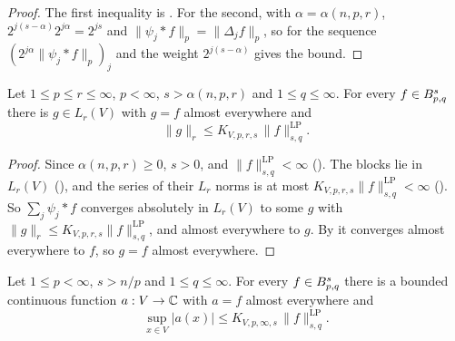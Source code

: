 \begin{proof}
\leanok
The first inequality is . For the second, with
$\alpha = \alpha(n, p, r)$, $2^{j(s - \alpha)} 2^{j\alpha} = 2^{js}$ and
$\|\psi_j * f\|_p = \|\Delta_j f\|_p$, so  for the sequence
$(2^{j\alpha} \|\psi_j * f\|_p)_j$ and the weight $2^{j(s-\alpha)}$ gives the bound.
\end{proof}

\begin{theorem}
\label{thm:besov-embedding-rd}
\leanok
{}
Let $1 \leq p \leq r \leq \infty$, $p < \infty$, $s > \alpha(n, p, r)$ and $1 \leq q \leq \infty$.
For every $f \in B^{s}_{p,q}$ there is $g \in L_r(V)$ with $g = f$ almost everywhere and
\[
  \|g\|_r \leq K_{V,p,r,s} \, \|f\|^{\mathrm{LP}}_{s,q} .
\]
\end{theorem}

\begin{proof}
\leanok
Since $\alpha(n, p, r) \geq 0$, $s > 0$, and $\|f\|^{\mathrm{LP}}_{s,q} < \infty$
(). The blocks lie in $L_r(V)$ (), and the series of
their $L_r$ norms is at most $K_{V,p,r,s} \|f\|^{\mathrm{LP}}_{s,q} < \infty$
(). So $\sum_j \psi_j * f$ converges absolutely in $L_r(V)$
to some $g$ with $\|g\|_r \leq K_{V,p,r,s} \|f\|^{\mathrm{LP}}_{s,q}$, and almost everywhere to
$g$. By  it converges almost everywhere to $f$, so $g = f$ almost
everywhere.
\end{proof}

\begin{theorem}
\label{thm:besov-embedding-bounded-continuous-rd}
\leanok
{}
Let $1 \leq p < \infty$, $s > n/p$ and $1 \leq q \leq \infty$. For every $f \in B^{s}_{p,q}$
there is a bounded continuous function $a : V \to \mathbb{C}$ with $a = f$ almost everywhere and
\[
  \sup_{x \in V} |a(x)| \leq K_{V,p,\infty,s} \, \|f\|^{\mathrm{LP}}_{s,q} .
\]
\end{theorem}

